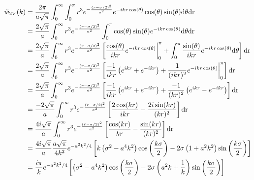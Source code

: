 \documentclass[letterpaper,twocolumn,amsmath,amssymb,prb]{revtex4-1}
\begin{document}
\begin{widetext}
\begin{align}
  \tilde{w}_{2V}(k) &= \frac{2 \pi}{a\sqrt{\pi}}\int_0^\infty \int_0^\pi r^3
  e^{-\frac{(r-\sigma/2)^2}{a^2}} e^{-ikr \cos(\theta)} \cos(\theta)
  \sin(\theta) \mathrm{d \theta dr} \\
  &= \frac{2 \sqrt{\pi}}{a}\int_0^\infty r^3
  e^{-\frac{(r-\sigma/2)^2}{a^2}} \int_0^\pi \cos(\theta)
  \sin(\theta)e^{-ikr \cos(\theta)}\mathrm{d \theta dr} \\
  &= \frac{2 \sqrt{\pi}}{a}\int_0^\infty r^3
  e^{-\frac{(r-\sigma/2)^2}{a^2}} \left[ \frac{\cos(\theta)}{ikr}
    e^{-ikr\cos(\theta)} \bigg{|}_0^\pi + \int_0^\pi
    \frac{\sin(\theta)}{ikr}e^{-ikr\cos(\theta)} \mathrm{d \theta}
    \right] \mathrm{dr} \\
  &= \frac{2 \sqrt{\pi}}{a}\int_0^\infty r^3
  e^{-\frac{(r-\sigma/2)^2}{a^2}} \left[ \frac{-1}{ikr}\left(
    e^{ikr} + e^{-ikr} \right) +
    \frac{1}{(ikr)^2}e^{-ikr\cos(\theta)} \bigg{|}_0^\pi \right]
  \mathrm{dr} \\
  &= \frac{2 \sqrt{\pi}}{a}\int_0^\infty r^3
  e^{-\frac{(r-\sigma/2)^2}{a^2}} \left[ \frac{-1}{ikr}\left(
    e^{ikr} + e^{-ikr} \right)
    +\frac{-1}{(kr)^2} \left(e^{ikr} -
    e^{-ikr}\right)\right] \mathrm{dr} \\
  &= \frac{-2 \sqrt{\pi}}{a}\int_0^\infty r^3
  e^{-\frac{(r-\sigma/2)^2}{a^2}} \left[ \frac{2\cos(kr)}{ikr}
    +\frac{2i\sin(kr)}{(kr)^2}\right] \mathrm{dr} \\
  &= \frac{4i \sqrt{\pi}}{a}\int_0^\infty r^3
  e^{-\frac{(r-\sigma/2)^2}{a^2}} \left[ \frac{\cos(kr)}{kr}
    -\frac{\sin(kr)}{(kr)^2}\right] \mathrm{dr} \\
  &= \frac{4i \sqrt{\pi}}{a} \frac{a \sqrt{\pi}} {4k^2}e^{-a^2k^2/4}\left[
    k \left(\sigma^2 -a^4k^2\right)\cos\left(\frac{k\sigma}{2}\right)
    - 2\sigma \left( 1+a^2k^2 \right) \sin\left( \frac{k\sigma}{2}\right) \right]\\
   &= \frac{i \pi}{k}e^{-a^2k^2/4}\left[ \left(\sigma^2 -
       a^4k^2\right) \cos\left(\frac{k\sigma}{2}\right) -
     2\sigma \left(a^2k + \frac{1}{k} \right)\sin\left(\frac{k\sigma}{2}\right) \right]
\end{align}


\end{widetext}
\end{document}
